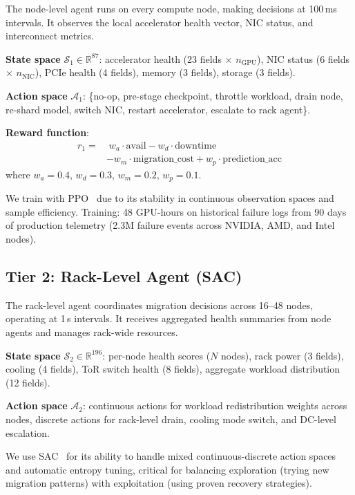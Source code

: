 \documentclass[conference,10pt,letterpaper]{IEEEtran}
\begin{document}
The node-level agent runs on every compute node, making decisions at 100\,ms intervals. It observes the local accelerator health vector, NIC status, and interconnect metrics.

\textbf{State space} $\mathcal{S}_1 \in \mathbb{R}^{87}$: accelerator health (23 fields $\times$ $n_{\text{GPU}}$), NIC status (6 fields $\times$ $n_{\text{NIC}}$), PCIe health (4 fields), memory (3 fields), storage (3 fields).

\textbf{Action space} $\mathcal{A}_1$: \{no-op, pre-stage checkpoint, throttle workload, drain node, re-shard model, switch NIC, restart accelerator, escalate to rack agent\}.

\textbf{Reward function}:
\begin{equation}
\begin{split}
r_1 = & \; w_a \cdot \text{avail} - w_d \cdot \text{downtime} \\
      & - w_m \cdot \text{migration\_cost} + w_p \cdot \text{prediction\_acc}
\end{split}
\end{equation}
where $w_a{=}0.4$, $w_d{=}0.3$, $w_m{=}0.2$, $w_p{=}0.1$.

We train with PPO~\cite{schulman2017ppo} due to its stability in continuous observation spaces and sample efficiency. Training: 48 GPU-hours on historical failure logs from 90 days of production telemetry (2.3M failure events across NVIDIA, AMD, and Intel nodes).

\subsection{Tier 2: Rack-Level Agent (SAC)}

The rack-level agent coordinates migration decisions across 16--48 nodes, operating at 1\,s intervals. It receives aggregated health summaries from node agents and manages rack-wide resources.

\textbf{State space} $\mathcal{S}_2 \in \mathbb{R}^{196}$: per-node health scores ($N$ nodes), rack power (3 fields), cooling (4 fields), ToR switch health (8 fields), aggregate workload distribution (12 fields).

\textbf{Action space} $\mathcal{A}_2$: continuous actions for workload redistribution weights across nodes, discrete actions for rack-level drain, cooling mode switch, and DC-level escalation.

We use SAC~\cite{haarnoja2018sac} for its ability to handle mixed continuous-discrete action spaces and automatic entropy tuning, critical for balancing exploration (trying new migration patterns) with exploitation (using proven recovery strategies).
\end{document}
